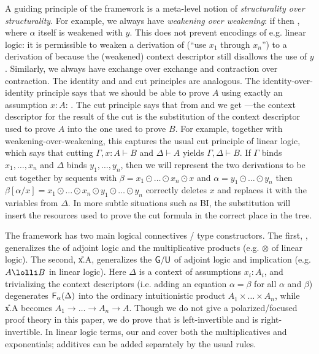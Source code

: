 A guiding principle of the framework is a meta-level notion of
\emph{structurality over structurality}.  For example, we always have
\emph{weakening over weakening}: if  then
, where $\alpha$ itself is weakened with $y$.
This does not prevent encodings of e.g. linear logic: it is permissible
to weaken a derivation of 
(``use $x_1$ through $x_n$'') to a derivation of  because the (weakened) context descriptor
still disallows the use of $y$.  Similarly, we always have exchange over
exchange and contraction over contraction.  The identity and and cut
principles are analogous.  The identity-over-identity principle says
that we should be able to prove $A$ using exactly an assumption $x:A$:
{}.  The cut principle says that from
 and  we get
{}---the context descriptor
for the result of the cut is the substitution of the context
descriptor used to prove $A$ into the one used to prove $B$.  For
example, together with weakening-over-weakening, this captures the
usual cut principle of linear logic, which says that cutting
$\Gamma,x:A \vdash B$ and $\Delta \vdash A$ yields $\Gamma,\Delta
\vdash B$.  If $\Gamma$ binds $x_1,\ldots,x_n$ and $\Delta$ binds
$y_1,\ldots,y_n$, then we will represent the two derivations to be
cut together by sequents with $\beta = x_1 \odot \ldots \odot x_n
\odot x$ and $\alpha = y_1 \odot \ldots \odot y_n$ then
$\beta[\alpha/x] = x_1 \odot \ldots \odot x_n \odot y_1 \odot \ldots \odot y_n$
correctly deletes $x$ and replaces it with the variables from $\Delta$.
In more subtle situations such as BI, the substitution will
insert the resources used to prove the cut formula in the correct place
in the tree.

The framework has two main logical connectives / type constructors.  The
first, \F{\alpha}{\Delta}, generalizes the  of adjoint logic and
the multiplicative products (e.g. $\otimes$ of linear logic).  The
second, \U{x.\alpha}{\Delta}{A}, generalizes the $\mathsf{G}/\mathsf{U}$ of
adjoint logic and implication (e.g. $A \lolli B$ in linear logic).  Here
$\Delta$ is a context of assumptions $x_i:A_i$, and trivializing the
context descriptors (i.e. adding an equation $\alpha = \beta$ for all
$\alpha$ and $\beta$) degenerates $\mathsf{F}_{\alpha}(\Delta)$ into the ordinary
intuitionistic product $A_1 \times \ldots \times A_n$, while
\U{x.\alpha}{\Delta}{A} becomes $A_1 \to \ldots \to A_n \to A$.  Though
we do not give a polarized/focused proof theory in this paper, we do
prove that  is left-invertible and  is right-invertible.
In linear logic terms, our  and  cover both the
multiplicatives and exponentials; additives can be added separately by
the usual rules.  

